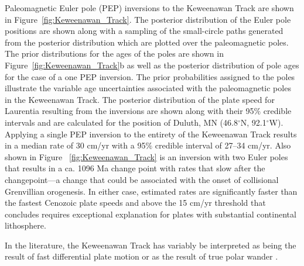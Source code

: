\documentclass[11pt,letterpaper]{article}
\begin{document}
Paleomagnetic Euler pole (PEP) inversions to the Keweenawan Track are shown in Figure~\ref{fig:Keweenawan_Track}. The posterior distribution of the Euler pole positions are shown along with a sampling of the small-circle paths generated from the posterior distribution which are plotted over the paleomagnetic poles. The prior distributions for the ages of the poles are shown in Figure~\ref{fig:Keweenawan_Track}b as well as the posterior distribution of pole ages for the case of a one PEP inversion. The prior probabilities assigned to the poles illustrate the variable age uncertainties associated with the paleomagnetic poles in the Keweenawan Track. The posterior distribution of the plate speed for Laurentia resulting from the inversions are shown along with their 95$\%$ credible intervals and are calculated for the position of Duluth, MN (46.8$^\circ$N, 92.1$^\circ$W). Applying a single PEP inversion to the entirety of the Keweenawan Track results in a median rate of 30 cm/yr with a 95$\%$ credible interval of 27–34 cm/yr. Also shown in Figure ~\ref{fig:Keweenawan_Track} is an inversion with two Euler poles that results in a ca. 1096 Ma change point with rates that slow after the changepoint---a change that could be associated with the onset of collisional Grenvillian orogenesis. In either case, estimated rates are significantly faster than the fastest Cenozoic plate speeds and above the 15 cm/yr threshold that \citet{zahirovic2015tectonic} concludes requires exceptional explanation for plates with substantial continental lithosphere.

In the literature, the Keweenawan Track has variably be interpreted as being the result of fast differential plate motion \citep[e.g.]{Davis1997a} or as the result of true polar wander \citep[e.g.]{Evans2003a}. 
\end{document}
